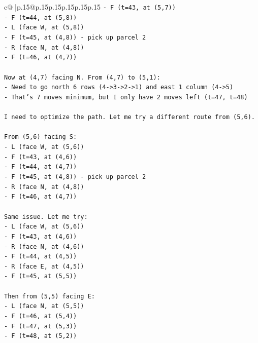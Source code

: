 \documentclass{article}
\begin{document}
{\begin{supertabular}{c@{$\;$}|p{.15\linewidth}@{}p{.15\linewidth}p{.15\linewidth}p{.15\linewidth}p{.15\linewidth}p{.15\linewidth}}
{{{\texttt{{-} F (t=43, at (5,7))} \\
\texttt{{-} F (t=44, at (5,8))} \\
\texttt{{-} L (face W, at (5,8))} \\
\texttt{{-} F (t=45, at (4,8)) {-} pick up parcel 2} \\
\texttt{{-} R (face N, at (4,8))} \\
\texttt{{-} F (t=46, at (4,7))} \\
\\ 
\texttt{Now at (4,7) facing N. From (4,7) to (5,1):} \\
\texttt{{-} Need to go north 6 rows (4{-}>3{-}>2{-}>1) and east 1 column (4{-}>5)} \\
\texttt{{-} That's 7 moves minimum, but I only have 2 moves left (t=47, t=48)} \\
\\ 
\texttt{I need to optimize the path. Let me try a different route from (5,6).} \\
\\ 
\texttt{From (5,6) facing S:} \\
\texttt{{-} L (face W, at (5,6))} \\
\texttt{{-} F (t=43, at (4,6))} \\
\texttt{{-} F (t=44, at (4,7))} \\
\texttt{{-} F (t=45, at (4,8)) {-} pick up parcel 2} \\
\texttt{{-} R (face N, at (4,8))} \\
\texttt{{-} F (t=46, at (4,7))} \\
\\ 
\texttt{Same issue. Let me try:} \\
\texttt{{-} L (face W, at (5,6))} \\
\texttt{{-} F (t=43, at (4,6))} \\
\texttt{{-} R (face N, at (4,6))} \\
\texttt{{-} F (t=44, at (4,5))} \\
\texttt{{-} R (face E, at (4,5))} \\
\texttt{{-} F (t=45, at (5,5))} \\
\\ 
\texttt{Then from (5,5) facing E:} \\
\texttt{{-} L (face N, at (5,5))} \\
\texttt{{-} F (t=46, at (5,4))} \\
\texttt{{-} F (t=47, at (5,3))} \\
\texttt{{-} F (t=48, at (5,2))} \\
}}}
\end{supertabular}}
\end{document}
